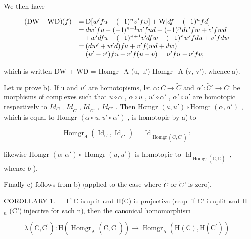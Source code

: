 We then have

\[
\begin{array}{r l} (\mathrm{DW} + \mathrm{WD}) (f) & = \mathrm{D} [ w ^ {\prime} f u + (- 1) ^ {n} v ^ {\prime} f w ] + \mathrm{W} [ d f - (- 1) ^ {n} f d ] \\ & = d w ^ {\prime} f u - (- 1) ^ {n + 1} w ^ {\prime} f u d + (- 1) ^ {n} d v ^ {\prime} f w + v ^ {\prime} f w d \\ & \quad + w ^ {\prime} d f u + (- 1) ^ {n + 1} v ^ {\prime} d f w - (- 1) ^ {n} w ^ {\prime} f d u + v ^ {\prime} f d w \\ & = (d w ^ {\prime} + w ^ {\prime} d) f u + v ^ {\prime} f (w d + d w) \\ & = (u ^ {\prime} - v ^ {\prime}) f u + v ^ {\prime} f (u - v) = u ^ {\prime} f u - v ^ {\prime} f v; \end{array}
\]

which is written DW + WD = Homgr\_A (u, u')-Homgr\_A (v, v'), whence a).

Let us prove b). If u and \(u'\) are homotopisms, let \(\alpha: C \to \tilde{C}\) and \(\alpha': \tilde{C}' \to C'\) be morphisms of complexes such that \(u \circ \alpha\) , \(\alpha \circ u\) , \(u' \circ \alpha'\) , \(\alpha' \circ u'\) are homotopic respectively to \(Id_{C}\) , \(Id_{\tilde{C}}\) , \(Id_{\tilde{C}'}\) , \(Id_{C'}\) . Then Homgr \((u, u') \circ \text{Homgr } (\alpha, \alpha')\) , which is equal to Homgr \((\alpha \circ u, u' \circ \alpha')\) , is homotopic by a) to

\[
\operatorname{Homgr} _ {A} \left(\operatorname{Id} _ {C}, \operatorname{Id} _ {C ^ {\prime}}\right) = \operatorname{Id} _ {\operatorname{Homgr} (C, C ^ {\prime})}:
\]

likewise Homgr \((\alpha, \alpha') \circ\) Homgr \((u, u')\) is homotopic to \(\operatorname{Id}_{\operatorname{Homgr}(\tilde{\mathbb{C}}, \tilde{\mathbb{C}})}\) , whence \(b\) ).

Finally c) follows from b) (applied to the case where \(\tilde{C}\) or \(\tilde{C}'\) is zero).

COROLLARY 1. --- If C is split and H(C) is projective (resp. if C' is split and H \(_{n}\) (C') injective for each n), then the canonical homomorphism

\[
\lambda (\mathrm{C}, \mathrm{C} ^ {\prime}): \mathrm{H} (\operatorname{Homgr} _ {\mathrm{A}} (\mathrm{C}, \mathrm{C} ^ {\prime})) \rightarrow \operatorname{Homgr} _ {\mathrm{A}} (\mathrm{H} (\mathrm{C}), \mathrm{H} (\mathrm{C} ^ {\prime}))
\]

